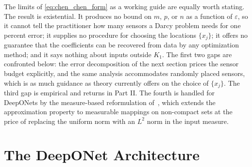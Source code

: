 The limits of \eqref{eq:chen_chen_form} as a working guide are equally worth stating. The result is existential. It produces no bound on $m$, $p$, or $n$ as a function of $\varepsilon$, so it cannot tell the practitioner how many sensors a Darcy problem needs for one percent error; it supplies no procedure for choosing the locations $\{x_{j}\}$; it offers no guarantee that the coefficients can be recovered from data by any optimization method; and it says nothing about inputs outside $K_{1}$. The first two gaps are confronted below: the error decomposition of the next section prices the sensor budget explicitly, and the same analysis accommodates randomly placed sensors, which is as much guidance as theory currently offers on the choice of $\{x_{j}\}$. The third gap is empirical and returns in Part II. The fourth is handled for DeepONets by the measure-based reformulation of~\cite{lanthaler2022error}, which extends the approximation property to measurable mappings on non-compact sets at the price of replacing the uniform norm with an $L^{2}$ norm in the input measure.

\section{The DeepONet Architecture}

